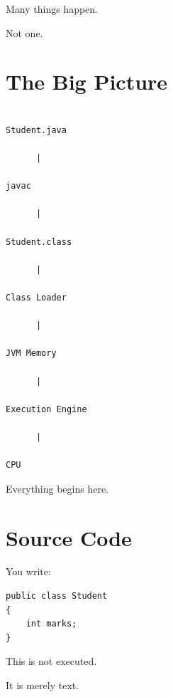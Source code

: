 \documentclass[11pt,a4paper]{book}
\begin{document}

Many things happen.


Not one.


\section{The Big Picture}

\begin{verbatim}

Student.java

      |

javac

      |

Student.class

      |

Class Loader

      |

JVM Memory

      |

Execution Engine

      |

CPU

\end{verbatim}


Everything begins here.


\section{Source Code}

You write:

\begin{verbatim} 
public class Student
{
    int marks;
}
\end{verbatim}


This is not executed.


It is merely text.

\end{document}
